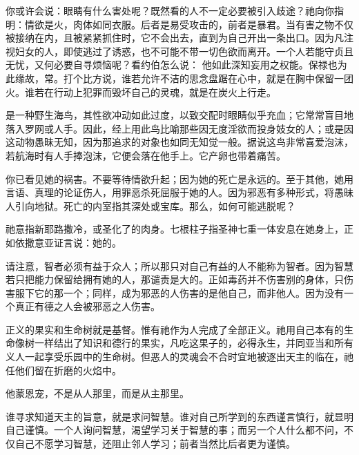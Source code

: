 你或许会说：眼睛有什么害处呢？既然看的人不一定必要被引入歧途？祂向你指明：情欲是火，肉体如同衣服。后者是易受攻击的，前者是暴君。当有害之物不仅被接纳在内，且被紧紧抓住时，它不会出去，直到为自己开出一条出口。因为凡注视妇女的人，即使逃过了诱惑，也不可能不带一切色欲而离开。一个人若能守贞且无忧，又何必要自寻烦恼呢？看约伯怎么说： 他如此深知妄用之权能。保禄也为此缘故，常。打个比方说，谁若允许不洁的思念盘踞在心中，就是在胸中保留一团火。谁若在行动上犯罪而毁坏自己的灵魂，就是在炭火上行走。\par

是一种野生海鸟，其性欲冲动如此过度，以致交配时眼睛似乎充血；它常常盲目地落入罗网或人手。因此，经上用此鸟比喻那些因无度淫欲而投身妓女的人；或是因这动物愚昧无知，因为那追求的对象也如同无知觉一般。据说这鸟非常喜爱泡沫，若航海时有人手捧泡沫，它便会落在他手上。它产卵也带着痛苦。\par

 你已看见她的祸害。不要等待情欲升起；因为她的死亡是永远的。至于其他，她用言语、真理的论证伤人，用罪恶杀死屈服于她的人。因为邪恶有多种形式，将愚昧人引向地狱。死亡的内室指其深处或宝库。那么，如何可能逃脱呢？\par

祂意指新耶路撒冷，或圣化了的肉身。七根柱子指圣神七重一体安息在她身上，正如依撒意亚证言说：她的。\par

请注意，智者必须有益于众人；所以那只对自己有益的人不能称为智者。因为智慧若只把能力保留给拥有她的人，那谴责是大的。正如毒药并不伤害别的身体，只伤害服下它的那一个；同样，成为邪恶的人伤害的是他自己，而非他人。因为没有一个真正有德之人会被邪恶之人伤害。\par

正义的果实和生命树就是基督。惟有祂作为人完成了全部正义。祂用自己本有的生命像树一样结出了知识和德行的果实，凡吃这果子的，必得永生，并同亚当和所有义人一起享受乐园中的生命树。但恶人的灵魂会不合时宜地被逐出天主的临在，祂任他们留在折磨的火焰中。\par

他蒙恩宠，不是从人那里，而是从主那里。\par

谁寻求知道天主的旨意，就是求问智慧。谁对自己所学到的东西谨言慎行，就显明自己谨慎。一个人询问智慧，渴望学习关于智慧的事；而另一个人什么都不问，不仅自己不愿学习智慧，还阻止邻人学习；前者当然比后者更为谨慎。\par

